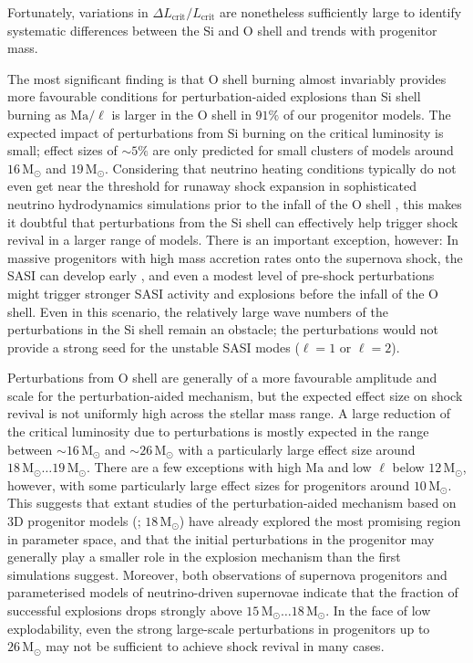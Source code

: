 \documentclass[useAMS,usenatbib]{mnras}
\newcommand{\Msun}{\ensuremath{\mathrm{M}_\odot}}
\begin{document}
Fortunately, variations in $\Delta L_\mathrm{crit}/L_\mathrm{crit}$
are nonetheless sufficiently large to identify systematic differences between
the Si and O shell and trends with progenitor mass.

The most significant finding is that O shell burning almost invariably
provides more favourable conditions for perturbation-aided explosions
than Si shell burning as $\mathrm{Ma}/\ell$ is larger in the O shell
in $91\%$ of our progenitor models.  The expected impact of
perturbations from Si burning on the critical luminosity is small;
effect sizes of $\mathord{\sim}5\%$ are only predicted for small
clusters of models around $16\,\Msun$ and $19 \,\Msun$.  Considering
that neutrino heating conditions typically do not even get near the
threshold for runaway shock expansion in sophisticated neutrino
hydrodynamics simulations prior to the infall of the O shell
\citep{summa_16,oconnor_16}, this makes it doubtful that perturbations
from the Si shell can effectively help trigger shock revival in a larger
range of models. There is an important exception, however: In massive
progenitors with high mass accretion rates onto the supernova shock,
the SASI can develop early
\citep{mueller_12b,hanke_13,couch_14b,kuroda_16b}, and even a modest
level of pre-shock perturbations might trigger stronger SASI activity
and explosions before the infall of the O shell.  Even in this
scenario, the relatively large wave numbers of the perturbations in the
Si shell remain an obstacle; the perturbations would not provide a
strong seed for the unstable SASI modes ($\ell=1$ or $\ell=2$).

Perturbations from O shell are generally of a more favourable
amplitude and scale for the perturbation-aided mechanism, but the
expected effect size on shock revival is not uniformly high across the
stellar mass range. A large reduction of the critical luminosity due
to perturbations is mostly expected in the range between
$\mathord{\sim} 16 \,\Msun$ and $\mathord{\sim}26\,\Msun$ with a
particularly large effect size around $18\,\Msun\ldots 19\,\Msun$.
There are a few exceptions with high $\mathrm{Ma}$ and low $\ell$
below $12\,\Msun$, however, with some particularly large effect sizes
for progenitors around $10\, \Msun$.  This suggests that extant
studies of the perturbation-aided mechanism based on 3D progenitor
models (\citealp{mueller_16b,mueller_17}; $18 \,\Msun$) have already
explored the most promising region in parameter space, and that the
initial perturbations in the progenitor may generally play a smaller
role in the explosion mechanism than the first simulations suggest.
Moreover, both observations of supernova progenitors
\citep{smartt_09a,smartt_09b,smartt_15} and parameterised models of
neutrino-driven supernovae
\citep{oconnor_11,ugliano_12,ertl_15,sukhbold_16,mueller_16a} indicate
that the fraction of successful explosions drops strongly above
$15\,\Msun\ldots 18 \,\Msun$. In the face of low explodability, even
the strong large-scale perturbations in progenitors up to $26 \,\Msun$
may not be sufficient to achieve shock revival in many cases.
\end{document}
